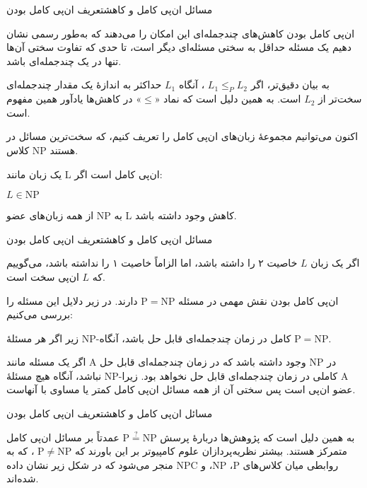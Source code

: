 \begin{itemframe-s}{مسائل ان‌پی کامل و کاهش}{تعریف ان‌پی کامل بودن}
\item[-]
ان‌پی کامل بودن کاهش‌های چندجمله‌ای این امکان را می‌دهند که به‌طور رسمی نشان دهیم یک مسئله حداقل به سختی مسئله‌ای دیگر است، تا حدی که تفاوت سختی آن‌ها تنها در یک چندجمله‌ای باشد.
\item[-]
 به بیان دقیق‌تر، اگر
 $L_1 \leq_P L_2$
، آنگاه
$L_1$
 حداکثر به اندازهٔ یک مقدار چندجمله‌ای سخت‌تر از
$L_2$
 است. به همین دلیل است که نماد «$\leq$» در کاهش‌ها یادآور همین مفهوم است.

\item[-]

اکنون می‌توانیم مجموعهٔ زبان‌های ان‌پی کامل را تعریف کنیم، که سخت‌ترین مسائل در کلاس NP هستند.

یک زبان مانند L ان‌پی کامل است اگر:
\item[1]
$L \in \mathrm{NP}$
\item[2]
از همه زبان‌های عضو NP  به L کاهش وجود داشته باشد.

\end{itemframe-s}



\begin{itemframe-s}{مسائل ان‌پی کامل و کاهش}{تعریف ان‌پی کامل بودن}
\item[-]
اگر یک زبان $L$ خاصیت ۲ را داشته باشد، اما الزاماً خاصیت ۱ را نداشته باشد، می‌گوییم که
 $L$
ان‌پی سخت
 است.
\item[-]
ان‌پی کامل بودن نقش مهمی در مسئله $\mathrm{P} = \mathrm{NP}$ دارند. در زیر دلایل این مسئله را بررسی می‌کنیم:
\item[1]
زیر اگر هر مسئلهٔ NP-کامل در زمان چندجمله‌ای قابل حل باشد، آنگاه $\mathrm{P} = \mathrm{NP}$.
\item[2]
 اگر یک مسئله مانند A در $\mathrm{NP}$ وجود داشته باشد که در زمان چندجمله‌ای قابل حل نباشد، آنگاه هیچ مسئلهٔ NP-کاملی در زمان چندجمله‌ای قابل حل نخواهد بود. زیرا A عضو ان‌پی است پس سختی آن از همه مسائل ان‌پی کامل کمتر یا مساوی با آنهاست.
\end{itemframe-s}


\begin{itemframe-s}{مسائل ان‌پی کامل و کاهش}{تعریف ان‌پی کامل بودن}
\item[-]
به همین دلیل است که پژوهش‌ها دربارهٔ پرسش
$\mathrm{P} \stackrel{?}{=} \mathrm{NP}$
عمدتاً بر مسائل ان‌پی کامل متمرکز هستند. بیشتر نظریه‌پردازان علوم کامپیوتر بر این باورند که
$\mathrm{P} \ne \mathrm{NP}$
، که به روابطی میان کلاس‌های
 $\mathrm{P}$، $\mathrm{NP}$، و $\mathrm{NPC}$
 منجر می‌شود که در شکل زیر نشان داده شده‌اند.
\item[-]
\end{itemframe-s}


